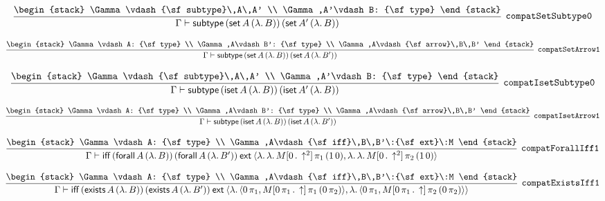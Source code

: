 \[
\infer[{\tt compatSetSubtype0}]{\Gamma \vdash {\sf subtype}\,({\sf set}\,A\,(\lambda .\,B))\,({\sf set}\,A'\,(\lambda .\,B))}{
\begin{stack}
\Gamma \vdash {\sf subtype}\,A\,A'
\\
\Gamma ,A'\vdash B: {\sf type}
\end{stack}}
\]

\[
\infer[{\tt compatSetArrow1}]{\Gamma \vdash {\sf subtype}\,({\sf set}\,A\,(\lambda .\,B))\,({\sf set}\,A\,(\lambda .\,B'))}{
\begin{stack}
\Gamma \vdash A: {\sf type}
\\
\Gamma ,A\vdash B': {\sf type}
\\
\Gamma ,A\vdash {\sf arrow}\,B\,B'
\end{stack}}
\]

\[
\infer[{\tt compatIsetSubtype0}]{\Gamma \vdash {\sf subtype}\,({\sf iset}\,A\,(\lambda .\,B))\,({\sf iset}\,A'\,(\lambda .\,B))}{
\begin{stack}
\Gamma \vdash {\sf subtype}\,A\,A'
\\
\Gamma ,A'\vdash B: {\sf type}
\end{stack}}
\]

\[
\infer[{\tt compatIsetArrow1}]{\Gamma \vdash {\sf subtype}\,({\sf iset}\,A\,(\lambda .\,B))\,({\sf iset}\,A\,(\lambda .\,B'))}{
\begin{stack}
\Gamma \vdash A: {\sf type}
\\
\Gamma ,A\vdash B': {\sf type}
\\
\Gamma ,A\vdash {\sf arrow}\,B\,B'
\end{stack}}
\]

\[
\infer[{\tt compatForallIff1}]{\Gamma \vdash {\sf iff}\,({\sf forall}\,A\,(\lambda .\,B))\,({\sf forall}\,A\,(\lambda .\,B'))\:{\sf ext}\:\langle \lambda .\,\lambda .\,M[0\,.\,\uparrow^2]\, \pi_1\,(1\,0),\lambda .\,\lambda .\,M[0\,.\,\uparrow^2]\, \pi_2\,(1\,0)\rangle }{
\begin{stack}
\Gamma \vdash A: {\sf type}
\\
\Gamma ,A\vdash {\sf iff}\,B\,B'\:{\sf ext}\:M
\end{stack}}
\]

\[
\infer[{\tt compatExistsIff1}]{\Gamma \vdash {\sf iff}\,({\sf exists}\,A\,(\lambda .\,B))\,({\sf exists}\,A\,(\lambda .\,B'))\:{\sf ext}\:\langle \lambda .\,\langle 0\, \pi_1,M[0\, \pi_1\,.\,\uparrow ]\, \pi_1\,(0\, \pi_2)\rangle ,\lambda .\,\langle 0\, \pi_1,M[0\, \pi_1\,.\,\uparrow ]\, \pi_2\,(0\, \pi_2)\rangle \rangle }{
\begin{stack}
\Gamma \vdash A: {\sf type}
\\
\Gamma ,A\vdash {\sf iff}\,B\,B'\:{\sf ext}\:M
\end{stack}}
\]

